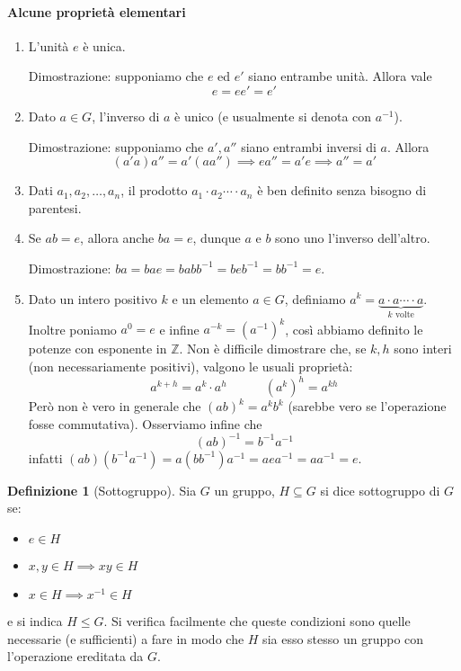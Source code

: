 \documentclass[11pt]{article}
\theoremstyle{plain}
\theoremstyle{definition}
\newtheorem{defn}{Definizione}[section]
\theoremstyle{remark}
\newcommand{\Z}{\mathbb{Z}}
\begin{document}
\paragraph{Alcune proprietà elementari}
\begin{enumerate}
	\item L'unità $e$ è unica.

	Dimostrazione: supponiamo che $e$ ed $e'$ siano entrambe unità. Allora vale
	\[e = ee' = e' \]
	\item Dato $a\in G$, l'inverso di $a$ è unico (e usualmente si denota con $a^{-1}$).

	Dimostrazione: supponiamo che $a', a''$ siano entrambi inversi di $a$. Allora
	\[(a' a)a'' = a'(aa'') \implies e a'' = a' e \implies a'' = a' \]
	
	\item Dati $a_1, a_2, \ldots, a_n$, il prodotto $a_1\cdot a_2 \cdots\cdot a_n$ è ben definito senza bisogno di parentesi.
	
	\item Se $ab = e$, allora anche $ba = e$, dunque $a$ e $b$ sono uno l'inverso dell'altro.

	Dimostrazione: $ba = bae = babb^{-1} = beb^{-1} = bb^{-1} = e$.

	\item Dato un intero positivo $k$ e un elemento $a\in G$, definiamo $a^k=\underbrace{a\cdot a \cdots\cdot a}_{k\text{ volte}}$.
	Inoltre poniamo $a^0 = e$ e infine $a^{-k} = (a^{-1})^k$, così abbiamo definito le potenze con esponente in $\Z$.
	Non è difficile dimostrare che, se $k,h$ sono interi (non necessariamente positivi), valgono le usuali proprietà:
	\[a^{k+h} = a^k \cdot a^h \quad\quad\quad (a^k)^h = a^{kh} \]
	Però non è vero in generale che $(ab)^k = a^kb^k$ (sarebbe vero se l'operazione fosse commutativa). Osserviamo infine che
	\[ (ab)^{-1} = b^{-1}a^{-1}\]
	infatti $(ab)(b^{-1} a^{-1}) = a(bb^{-1})a^{-1} = aea^{-1} = aa^{-1} = e$.
\end{enumerate}



\begin{defn}[Sottogruppo]
Sia $G$ un gruppo, $H\subseteq G$ si dice sottogruppo di $G$ se:
\begin{itemize}
	\item $e\in H$
	\item $x,y\in H \implies xy\in H$
	\item $x\in H \implies x^{-1}\in H$
\end{itemize}
e si indica $H \leq G$. Si verifica facilmente che queste condizioni sono quelle necessarie (e sufficienti) a fare in modo che $H$ sia esso stesso un gruppo con l'operazione ereditata da $G$.
\end{defn}
\end{document}
